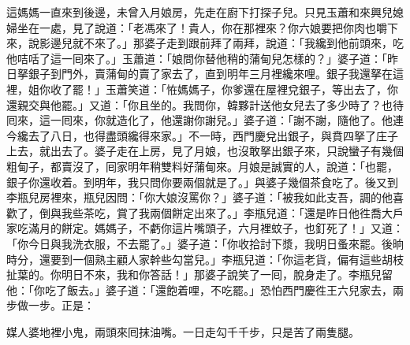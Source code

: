 這媽媽一直來到後邊，未曾入月娘房，先走在廚下打探子兒。只見玉蕭和來興兒媳婦坐在一處，見了說道：「老馮來了！貴人，你在那裡來？你六娘要把你肉也嚼下來，說影邊兒就不來了。」那婆子走到跟前拜了兩拜，說道：「我纔到他前頭來，吃他咭咶了這一囘來了。」玉蕭道：「娘問你替他稍的蒲甸兒怎樣的？」婆子道：「昨日拏銀子到門外，賣蒲甸的賣了家去了，直到明年三月裡纔來哩。銀子我還拏在這裡，姐你收了罷！」玉蕭笑道：「恠媽媽子，你爹還在屋裡兌銀子，等出去了，你還親交與他罷。」又道：「你且坐的。我問你，韓夥計送他女兒去了多少時了？也待囘來，這一囘來，你就造化了，他還謝你謝兒。」婆子道：「謝不謝，隨他了。他連今纔去了八日，也得盡頭纔得來家。」不一時，西門慶兌出銀子，與賁四拏了庄子上去，就出去了。婆子走在上房，見了月娘，也沒敢拏出銀子來，只說蠻子有幾個粗甸子，都賣沒了，囘家明年稍雙料好蒲甸來。月娘是誠實的人，說道：「也罷，銀子你還收着。到明年，我只問你要兩個就是了。」與婆子幾個茶食吃了。後又到李瓶兒房裡來，瓶兒因問：「你大娘沒罵你？」婆子道：「被我如此支吾，調的他喜歡了，倒與我些茶吃，賞了我兩個餅定出來了。」李瓶兒道：「還是昨日他徃喬大戶家吃滿月的餅定。媽媽子，不虧你這片嘴頭子，六月裡蚊子，也釘死了！」又道：「你今日與我洗衣服，不去罷了。」婆子道：「你收拾討下漿，我明日蚤來罷。後晌時分，還要到一個熟主顧人家幹些勾當兒。」李瓶兒道：「你這老貨，偏有這些胡枝扯葉的。你明日不來，我和你答話！」那婆子說笑了一囘，脫身走了。李瓶兒留他：「你吃了飯去。」婆子道：「還飽着哩，不吃罷。」恐怕西門慶徃王六兒家去，兩步做一步。正是：

媒人婆地裡小鬼，兩頭來囘抹油嘴。一日走勾千千步，只是苦了兩隻腿。

